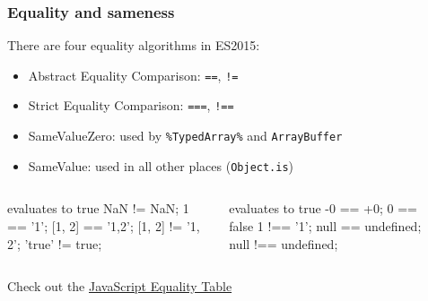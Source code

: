 \begin{frame}[fragile]
  \frametitle{Equality and sameness}
  There are four equality algorithms in ES2015:
  \begin{itemize}
    \item Abstract Equality Comparison: \verb|==|, \verb|!=|
    \item Strict Equality Comparison: \verb|===|, \verb|!==|
    \item SameValueZero: used by \verb|%TypedArray%| and \verb|ArrayBuffer|
    \item SameValue: used in all other places (\verb|Object.is|)
  \end{itemize}
\begin{columns}[onlytextwidth]
  \begin{column}{0.45\textwidth}
\begin{CodeBox}{evaluates to true}
  NaN != NaN;
  1 == '1';
  [1, 2] == '1,2';
  [1, 2] != '1, 2';
  'true' != true;
\end{CodeBox}
  \end{column}
  \begin{column}{0.45\textwidth}
\begin{CodeBox}{evaluates to true}
  -0 == +0;
  0 == false
  1 !== '1';
  null == undefined;
  null !== undefined;
\end{CodeBox}
  \end{column}
  \begin{column}{0.3\textwidth}  \end{column}
\end{columns}%
Check out the \href{https://dorey.github.io/JavaScript-Equality-Table/}{JavaScript Equality Table} 
\end{frame}
